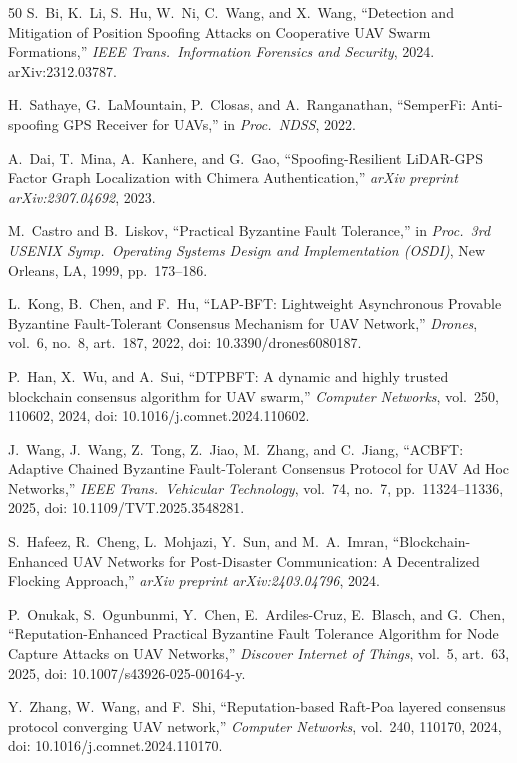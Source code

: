 \documentclass[conference,10pt]{IEEEtran}
\begin{document}
\begin{thebibliography}{50}
S.~Bi, K.~Li, S.~Hu, W.~Ni, C.~Wang, and X.~Wang,
``Detection and Mitigation of Position Spoofing Attacks on Cooperative UAV Swarm Formations,''
\emph{IEEE Trans.\ Information Forensics and Security}, 2024. arXiv:2312.03787.

H.~Sathaye, G.~LaMountain, P.~Closas, and A.~Ranganathan,
``SemperFi: Anti-spoofing GPS Receiver for UAVs,''
in \emph{Proc.\ NDSS}, 2022.

A.~Dai, T.~Mina, A.~Kanhere, and G.~Gao,
``Spoofing-Resilient LiDAR-GPS Factor Graph Localization with Chimera Authentication,''
\emph{arXiv preprint arXiv:2307.04692}, 2023.

M.~Castro and B.~Liskov,
``Practical Byzantine Fault Tolerance,''
in \emph{Proc.\ 3rd USENIX Symp.\ Operating Systems Design and Implementation (OSDI)}, New Orleans, LA, 1999, pp.~173--186.

L.~Kong, B.~Chen, and F.~Hu,
``LAP-BFT: Lightweight Asynchronous Provable Byzantine Fault-Tolerant Consensus Mechanism for UAV Network,''
\emph{Drones}, vol.~6, no.~8, art.~187, 2022,
doi: 10.3390/drones6080187.

P.~Han, X.~Wu, and A.~Sui,
``DTPBFT: A dynamic and highly trusted blockchain consensus algorithm for UAV swarm,''
\emph{Computer Networks}, vol.~250, 110602, 2024,
doi: 10.1016/j.comnet.2024.110602.

J.~Wang, J.~Wang, Z.~Tong, Z.~Jiao, M.~Zhang, and C.~Jiang,
``ACBFT: Adaptive Chained Byzantine Fault-Tolerant Consensus Protocol for UAV Ad Hoc Networks,''
\emph{IEEE Trans.\ Vehicular Technology}, vol.~74, no.~7, pp.~11324--11336, 2025,
doi: 10.1109/TVT.2025.3548281.

S.~Hafeez, R.~Cheng, L.~Mohjazi, Y.~Sun, and M.~A.~Imran,
``Blockchain-Enhanced UAV Networks for Post-Disaster Communication: A Decentralized Flocking Approach,''
\emph{arXiv preprint arXiv:2403.04796}, 2024.

P.~Onukak, S.~Ogunbunmi, Y.~Chen, E.~Ardiles-Cruz, E.~Blasch, and G.~Chen,
``Reputation-Enhanced Practical Byzantine Fault Tolerance Algorithm for Node Capture Attacks on UAV Networks,''
\emph{Discover Internet of Things}, vol.~5, art.~63, 2025,
doi: 10.1007/s43926-025-00164-y.

Y.~Zhang, W.~Wang, and F.~Shi,
``Reputation-based Raft-Poa layered consensus protocol converging UAV network,''
\emph{Computer Networks}, vol.~240, 110170, 2024,
doi: 10.1016/j.comnet.2024.110170.


\end{thebibliography}
\end{document}
